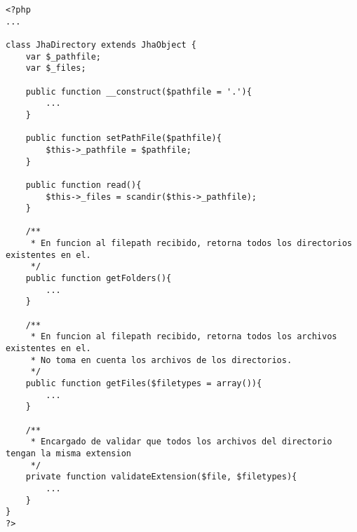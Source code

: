 \begin{lstlisting}[label=jha_directory,caption=JhaDirectory.]
<?php
...

class JhaDirectory extends JhaObject {
	var $_pathfile;
	var $_files;
	
	public function __construct($pathfile = '.'){
		...
	}
	
	public function setPathFile($pathfile){
		$this->_pathfile = $pathfile;
	}
	
	public function read(){
        $this->_files = scandir($this->_pathfile);
	}
	
	/**
	 * En funcion al filepath recibido, retorna todos los directorios existentes en el.
	 */
	public function getFolders(){
		...
	}
	
	/**
	 * En funcion al filepath recibido, retorna todos los archivos existentes en el.
	 * No toma en cuenta los archivos de los directorios.
	 */
	public function getFiles($filetypes = array()){
		...
	}
	
	/**
	 * Encargado de validar que todos los archivos del directorio tengan la misma extension
	 */
	private function validateExtension($file, $filetypes){
		...
	}
}
?>
\end{lstlisting}
